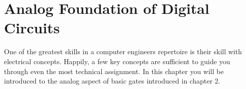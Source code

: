 \chapter{Analog Foundation of Digital Circuits}
\label{chapter:Analog Foundation}
\graphicspath{ {./chapter09/Fig} }

One of the greatest skills in a computer engineers repertoire 
is their skill with electrical concepts.  Happily, a few 
key concepts are sufficient to guide you
through even the most technical assignment.  In this chapter 
you will be introduced to the analog aspect of basic gates
introduced in chapter 2.  



